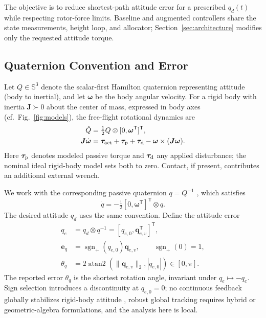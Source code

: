 \documentclass[letterpaper, 10 pt, conference]{ieeeconf}
\newcommand{\T}{^{\mathsf T}}
\newcommand{\sgnp}{\operatorname{sgn}_{+}}
\begin{document}
The objective is to reduce shortest-path attitude error for a prescribed
$q_d(t)$ while respecting rotor-force limits. Baseline and augmented
controllers share the state measurements, height loop, and allocator;
Section~\ref{sec:architecture} modifies only the requested attitude torque.

%

\subsection{Quaternion Convention and Error}
Let $Q\in\mathbb S^3$ denote the scalar-first Hamilton quaternion representing attitude (body to inertial), and let $\bm\omega$ be the body angular velocity. For a rigid body with inertia $\bm J\succ0$ about the center of mass, expressed in body axes (cf.~Fig.~\ref{fig:models}), the free-flight rotational dynamics are \cite{schaub2018amss}
\begin{align}
 \dot Q&=\tfrac12 Q\otimes[0,\bm\omega\T]\T,\\
 \bm J\dot{\bm\omega}&=\bm\tau_{\rm act}+\bm\tau_{\rm p}
       +\bm\tau_{\rm d}-\bm\omega\times(\bm J\bm\omega).
 \label{eq:plant}
\end{align}
Here $\bm\tau_{\rm p}$ denotes modeled passive torque and $\bm\tau_{\rm d}$ any applied disturbance; the nominal ideal rigid-body model sets both to zero. Contact, if present, contributes an additional external wrench.

We work with the corresponding passive quaternion $q=Q^{-1}$ \cite{diebel2006quaternion}, which satisfies
\begin{equation}
 \dot q=-\tfrac12[0,\bm\omega\T]\T\otimes q.
 \label{eq:passive}
\end{equation}
The desired attitude $q_d$ uses the same convention. Define the attitude error
\begin{align}
 q_e&=q_d\otimes q^{-1}=[q_{e,0},\bm q_{e,v}\T]\T,\\
 \bm e_q&=\sgnp(q_{e,0})\bm q_{e,v},\qquad \sgnp(0)=1,\\
 \theta_q&=2\operatorname{atan2}(\|\bm q_{e,v}\|_2,|q_{e,0}|)
             \in[0,\pi].
 \label{eq:theta}
\end{align}
The reported error $\theta_q$ is the shortest rotation angle, invariant under $q_e\mapsto-q_e$. Sign selection introduces a discontinuity at $q_{e,0}=0$; no continuous feedback globally stabilizes rigid-body attitude \cite{bhat2000topological,chaturvedi2011rigid}, robust global tracking requires hybrid \cite{mayhew2011hybrid} or geometric-algebra \cite{rubioscola2026ga,escamilla2023ga} formulations, and the analysis here is local.
\end{document}
